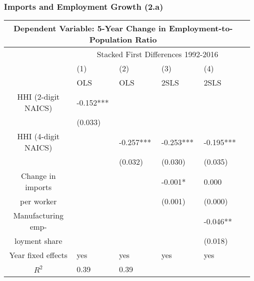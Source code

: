 \documentclass[11pt]{beamer}
\begin{document}
\begin{frame}
\frametitle{Imports and Employment Growth (2.a)}
\begin{table}
  \centering 
    {\tiny \begin{tabularx}{1.0\textwidth}{ c *{5}{X} }
    \toprule
    \multicolumn{5}{c}{Dependent Variable: 5-Year Change in Employment-to-Population Ratio} \\
    \midrule
    & \multicolumn{4}{c}{Stacked First Differences 1992-2016}\\
        \cmidrule{2-5}
    & (1) & (2) & (3) & (4)  \\
    & OLS & OLS & 2SLS & 2SLS  \\
    \midrule
HHI (2-digit NAICS) & -0.152*** \\
                                & (0.033) \\
\midrule
HHI (4-digit NAICS)& & -0.257*** & -0.253*** & -0.195*** \\
			      & & (0.032) & (0.030) & (0.035) \\
\midrule
Change in imports &  &  & -0.001* & 0.000 \\
per worker	     &  &  & (0.001) & (0.000) \\
\midrule
Manufacturing emp- & & & & -0.046** \\
loyment share & & & & (0.018)  \\
 \midrule
 Year fixed effects & yes & yes & yes & yes \\
    \midrule
    \midrule
 $R^2$ & 0.39 & 0.39 \\ %
 \bottomrule
    \end{tabularx}}
\end{table}
\end{frame}
\end{document}
